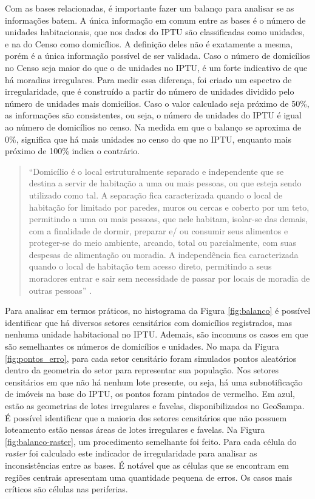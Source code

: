 Com as bases relacionadas, é importante fazer um balanço para analisar se as informações batem. A única informação em comum entre as bases é o número de unidades habitacionais, que nos dados do IPTU são classificadas como unidades, e na do Censo como domicílios. A definição deles não é exatamente a mesma, porém é a única informação possível de ser validada. Caso o número de domicílios no Censo seja maior do que o de unidades no IPTU, é um forte indicativo de que há moradias irregulares. Para medir essa diferença, foi criado um espectro de irregularidade, que é construído a partir do número de unidades dividido pelo número de unidades mais domicílios. Caso o valor calculado seja próximo de 50\%, as informações são consistentes, ou seja, o número de unidades do IPTU é igual ao número de domicílios no censo. Na medida em que o balanço se aproxima de 0\%, significa que há mais unidades no censo do que no IPTU, enquanto mais próximo de 100\% indica o contrário.

\begin{quote}
    ``Domicílio é o local estruturalmente separado e independente que se destina a servir de habitação a uma ou mais pessoas, ou que esteja sendo utilizado como tal. A separação fica caracterizada quando o local de habitação for limitado por paredes, muros ou cercas e coberto por um teto, permitindo a uma ou mais pessoas, que nele habitam, isolar-se das demais, com a finalidade de dormir, preparar e/ ou consumir seus alimentos e proteger-se do meio ambiente, arcando, total ou parcialmente, com suas despesas de alimentação ou moradia. A independência fica caracterizada quando o local de habitação tem acesso direto, permitindo a seus moradores entrar e sair sem necessidade de passar por locais de moradia de outras pessoas'' \cite{IBGE2013}.
\end{quote}

Para analisar em termos práticos, no histograma da Figura \ref{fig:balanco} é possível identificar que há diversos setores censitários com domicílios registrados, mas nenhuma unidade habitacional no IPTU. Ademais, são incomuns os casos em que são semelhantes os números de domicílios e unidades. No mapa da Figura \ref{fig:pontos_erro}, para cada setor censitário foram simulados pontos aleatórios dentro da geometria do setor para representar sua população. Nos setores censitários em que não há nenhum lote presente, ou seja, há uma subnotificação de imóveis na base do IPTU, os pontos foram pintados de vermelho. Em azul, estão as geometrias de lotes irregulares e favelas, disponibilizados no GeoSampa. É possível identificar que a maioria dos setores censitários que não possuem loteamento estão nessas áreas de lotes irregulares e favelas.  Na Figura \ref{fig:balanco-raster}, um procedimento semelhante foi feito. Para cada célula do \textit{raster} foi calculado este indicador de irregularidade para analisar as inconsistências entre as bases. É notável que as células que se encontram em regiões centrais apresentam uma quantidade pequena de erros. Os casos mais críticos são células nas periferias.

